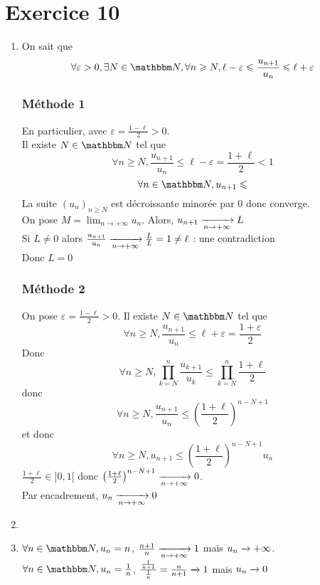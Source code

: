 \part{Exercice 10}

\begin{enumerate}
	\item On sait que \[
	\forall \varepsilon>0, \exists N \in \N, \forall n \ge  N, \ell - \varepsilon \le \frac{u_{n+1}}{u_n} \le \ell + \varepsilon
	\] 

	\section{Méthode 1}

	En particulier, avec $\varepsilon = \frac{1 - \ell}{2} > 0$.\\
	Il existe $N \in \N$ tel que \[
	\forall n \ge N, \frac{u_{n+1}}{u_n} \le \ell-\varepsilon = \frac{1+\ell}{2} < 1
	\] \[
	\forall  n \in \N, u_{n+1} \le 
	\]
	La suite $(u_n)_{n \ge N}$ est décroissante minorée par $0$ donc converge. \\
	On pose $M = \lim_{n \to +\infty}u_n$. Alors, $u_{n+1} \xrightarrow[n\to +\infty]{} L$\\
	Si $L \neq 0$ alors $\frac{u_{n+1}}{u_n} \xrightarrow[n \to +\infty]{} \frac{L}{L} = 1 \neq \ell$ : une contradiction \\
	Donc $L = 0$ 

	\section{Méthode 2}

	On pose $\varepsilon = \frac{1 - \ell}{2} > 0$. Il existe $N \in \N$ tel que \[
	\forall n \ge N, \frac{u_{n+1}}{u_n} \le \ell + \varepsilon = \frac{1 + \varepsilon}{2}
	\] Donc \[
	\forall n \ge N, \prod_{k=N}^{n} \frac{u_{k+1}}{u_k} \le \prod_{k=N}^{n} \frac{1+\ell}{2}
	\] donc \[
	\forall n \ge N, \frac{u_{n+1}}{u_n} \le \left( \frac{1+\ell}{2} \right) ^{n - N + 1}
	\] et donc \[
	\forall n \ge N, u_{n+1} \le  \left( \frac{1+\ell}{2} \right)^{n-N +1}u_n
	\] 
	$\frac{1+\ell}{2} \in ]0, 1[$ donc $\left( \frac{1+\ell}{2} \right)^{n-N+1} \xrightarrow[n \to +\infty]{} 0$.\\
	Par encadrement, $u_n \xrightarrow[n \to +\infty]{} 0$ 
\item
\item $\forall n \in \N, u_n = n$, $\frac{n+1}{n} \xrightarrow[n\to +\infty]{}1$ mais $u_n \xrightarrow[]{} +\infty$.\\
	$\forall n \in \N, u_n = \frac{1}{n}$, $\frac{\frac{1}{n+1}}{\frac{1}{n}} = \frac{n}{n+1} \xrightarrow[]{} 1$ mais $u_n \xrightarrow[]{} 0$
\end{enumerate}
